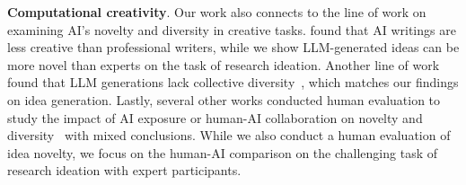 \textbf{Computational creativity}.
Our work also connects to the line of work on examining AI's novelty and diversity in creative tasks. 
\citet{Chakrabarty2023ArtOA} found that  AI writings are less creative than professional writers, while we show LLM-generated ideas can be more novel than experts on the task of research ideation. 
Another line of work found that LLM generations lack collective diversity~\cite{Zhou2024SharedIL,Anderson2024HomogenizationEO}, which matches our findings on idea generation. 
Lastly, several other works conducted human evaluation to study the impact of AI exposure or human-AI collaboration on novelty and diversity~\cite{Padmakumar2023DoesWW,Ashkinaze2024HowAI,Liu2023HowAP} with mixed conclusions. While we also conduct a human evaluation of idea novelty, we focus on the human-AI comparison on the challenging task of research ideation with expert participants.  

%
%
%
%






